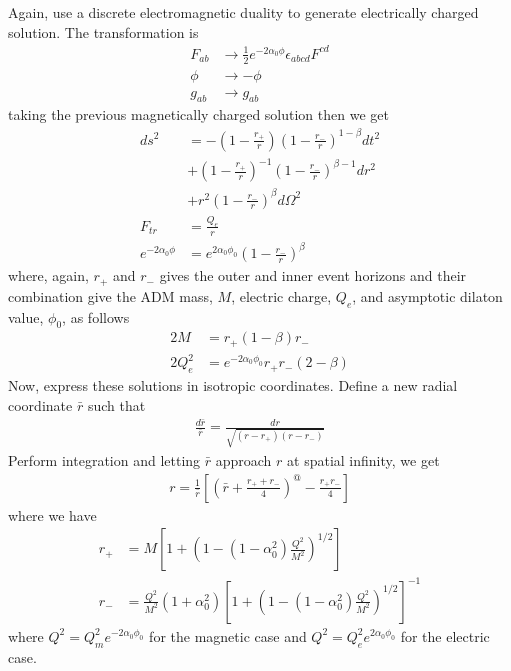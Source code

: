 \documentclass[%
 reprint,
 amsmath,amssymb,
 aps,
]{revtex4-1}
\begin{document}
Again, use a discrete electromagnetic duality to generate electrically charged solution. The transformation is
\begin{align}
F_{ab} &\rightarrow \frac{1}{2} e^{-2 \alpha_0 \phi} \epsilon_{abcd} F^{cd} \\
\phi &\rightarrow -\phi \\
g_{ab} &\rightarrow g_{ab}
\end{align}
taking the previous magnetically charged solution then we get
\begin{align}
ds^2 &= -\left(1-\frac{r_+}{r} \right) \left(1-\frac{r_-}{r} \right)^{1-\beta} dt^2 \nonumber \\
&+ \left(1-\frac{r_+}{r} \right)^{-1} \left(1-\frac{r_-}{r} \right)^{\beta-1} dr^2 \nonumber \\
&+ r^2 \left(1-\frac{r_-}{r}\right)^\beta d \Omega^2 \\
F_{tr} &= \frac{Q_e}{r}  \\
e^{-2 \alpha_0 \phi} &= e^{2 \alpha_0 \phi_0} \left(1-\frac{r_-}{r} \right)^\beta
\end{align}
where, again, $r_+$ and $r_-$ gives the outer and inner event horizons and their combination give the ADM mass, $M$, electric charge, $Q_e$, and asymptotic dilaton value, $\phi_0$, as follows
\begin{align}
2M &= r_+ (1-\beta)r_- \\
2Q_e^2 &= e^{-2\alpha_0 \phi_0} r_+ r_- (2-\beta)
\end{align}
Now, express these solutions in isotropic coordinates. Define a new radial coordinate $\bar{r}$ such that
\begin{align}
\frac{d\bar{r}}{\bar{r}} = \frac{dr}{\sqrt{(r-r_+)(r-r_-)}}
\end{align}
Perform integration and letting $\bar{r}$ approach $r$ at spatial infinity, we get
\begin{align}
r=\frac{1}{\bar{r}} \left[ \left( \bar{r} + \frac{r_+ + r_-}{4} \right)^@ - \frac{r_+ r_-}{4} \right]
\end{align}
where we have
\begin{align}
r_+ &= M \left[1+\left(1-(1-\alpha_0^2) \frac{Q^2}{M^2} \right)^{1/2} \right] \\
r_- &= \frac{Q^2}{M^2}(1+\alpha_0^2) \left[1+\left(1-(1-\alpha_0^2) \frac{Q^2}{M^2} \right)^{1/2} \right]^{-1}
\end{align}
where $Q^2 = Q_m^2 e^{-2 \alpha_0 \phi_0}$ for the magnetic case and $Q^2 = Q_e^2 e^{2 \alpha_0 \phi_0}$ for the electric case.
\end{document}
